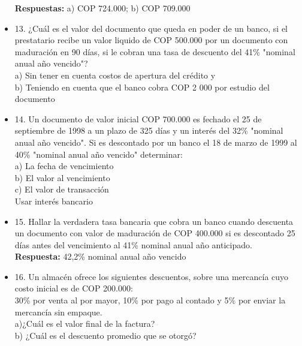 \begin{itemize}
       \textbf{Respuestas:} a) COP 724.000; b) COP 709.000
       \medskip

 \item 13. ¿Cuál es el valor del documento que queda en poder de un banco, si el prestatario recibe un valor liquido de  COP 500.000 por un documento con maduración en 90 días, si le cobran una tasa de descuento del 41\% "nominal anual año vencido"? \\

       a) Sin tener en cuenta costos de apertura del crédito y\\
       b) Teniendo en cuenta que el banco cobra COP 2 000 por estudio del documento \\
       \medskip

 \item 14. Un documento de valor inicial COP 700.000 es fechado el 25 de septiembre de 1998 a un plazo de 325 días y un interés del 32\% "nominal anual año vencido". Si es descontado por un banco el 18 de marzo de 1999 al 40\% "nominal anual año vencido" determinar:\\

       a) La fecha de vencimiento\\
       b) El valor al vencimiento\\
       c) El valor de transacción \\
       Usar interés bancario\\

       \medskip

 \item 15. Hallar la verdadera tasa bancaria que cobra un banco cuando descuenta un documento con valor de maduración de COP 400.000 si es descontado 25 días antes del vencimiento al 41\% nominal anual año anticipado.\\

       \textbf{Respuesta:} 42,2\% nominal anual año vencido
       \medskip

 \item 16. Un almacén ofrece los siguientes descuentos, sobre una mercancía cuyo costo inicial es de COP 200.000:\\

       30\% por venta al por mayor, 10\% por pago al contado y 5\% por enviar la mercancía sin empaque.\\

       a)¿Cuál es el valor final de la factura?\\
       b) ¿Cuál es el descuento promedio que se otorgó?\\


\end{itemize}
